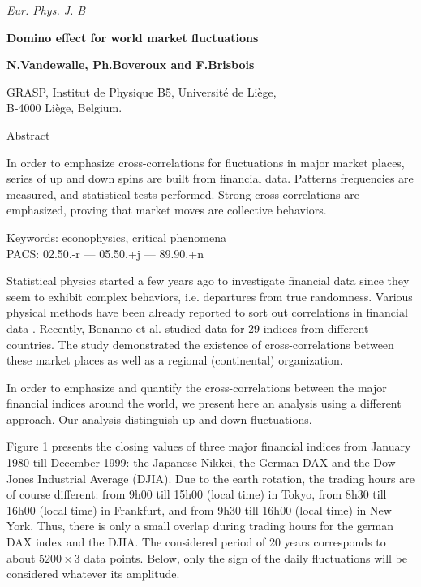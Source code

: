 \documentclass[12pt]{article}
\begin{document}
\small{\it Eur. Phys. J. B}
\vskip 3.0cm

\begin{center}
{\Large \bf Domino effect for world market fluctuations}

\vskip 1.5cm 
{\large \bf N.Vandewalle, Ph.Boveroux and F.Brisbois}

\vskip 0.5cm
GRASP, Institut de Physique B5, Universit\'e de Li\`ege, \\ 
B-4000 Li\`ege, Belgium.

\end{center}

\vskip 3.0cm
{\noindent \large Abstract}
\vskip 0.6cm

In order to emphasize cross-correlations for fluctuations in major market places, series of up and down spins are built from financial data. Patterns frequencies are measured, and statistical tests performed. Strong cross-correlations are emphasized, proving that market moves are collective behaviors. 

\vskip 0.5cm
{\noindent Keywords: econophysics, critical phenomena \\
PACS: 02.50.-r --- 05.50.+j --- 89.90.+n} 

\newpage

Statistical physics started a few years ago to investigate financial data since they seem to exhibit complex behaviors, i.e. departures from true randomness. Various physical methods have been already reported to sort out correlations in financial data \cite{mantegna,dfa}. Recently, Bonanno et al. \cite{bonanno} studied data for 29 indices from different countries. The study demonstrated the existence of cross-correlations between these market places as well as a regional (continental) organization.

In order to emphasize and quantify the cross-correlations between the major financial indices around the world, we present here an analysis using a different approach. Our analysis distinguish up and down fluctuations. 

Figure 1 presents the closing values of three major financial indices from January 1980 till December 1999: the Japanese Nikkei, the German DAX and the Dow Jones Industrial Average (DJIA). Due to the earth rotation, the trading hours are of course different: from 9h00 till 15h00 (local time) in Tokyo, from 8h30 till 16h00 (local time) in Frankfurt, and from 9h30 till 16h00 (local time) in New York. Thus, there is only a small overlap during trading hours for the german DAX index and the DJIA. The considered period of 20 years corresponds to about $5200 \times 3$ data points. Below, only the sign of the daily fluctuations will be considered whatever its amplitude. 
\end{document}

